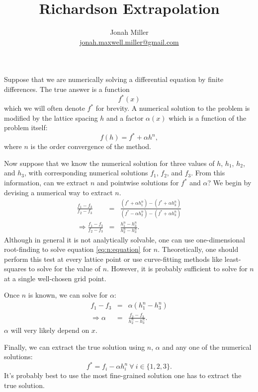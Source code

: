 \documentclass[]{article}
\author{Jonah Miller\\
  \href{mailto:jonah.maxwell.miller@gmail.com}{jonah.maxwell.miller@gmail.com}}
\title{Richardson Extrapolation}
\begin{document}
\maketitle

Suppose that we are numerically solving a differential equation by
finite differences. The true answer is a function
\begin{equation}
  \label{eq:f^*(x)}
  f^*(x)
\end{equation}
which we will often denote $f^*$ for brevity. A numerical solution to
the problem is modified by the lattice spacing $h$ and a factor
$\alpha(x)$ which is a function of the problem itself:
\begin{equation}
  \label{eq:f(h)}
  f(h) = f^* + \alpha h^n,
\end{equation}
where $n$ is the order convergence of the method.

Now suppose that we know the numerical solution for three values of
$h$, $h_1$, $h_2$, and $h_3$, with corresponding numerical solutions
$f_1$, $f_2$, and $f_3$. From this information, can we extract $n$ and
pointwise solutions for $f^*$ and $\alpha$? We begin by devising a
numerical way to extract $n$. 
\begin{eqnarray}
  \frac{f_1 - f_3}{f_2-f_3} &=& \frac{(f^* + \alpha h_1^n) - (f^*+\alpha h_3^n)}{(f^* - \alpha h_2^n) - (f^* + \alpha h_3^n)}\nonumber\\
  \label{eq:n:equation}
  \Rightarrow \frac{f_1 - f_3}{f_2-f_3} &=& \frac{h_1^n - h_3^n}{h_2^n - h_3^n}.
\end{eqnarray}
Although in general it is not analytically solvable, one can use
one-dimensional root-finding to solve equation \eqref{eq:n:equation}
for $n$. Theoretically, one should perform this test at every lattice
point or use curve-fitting methods like least-squares to solve for the
value of $n$. However, it is probably sufficient to solve for $n$ at a
single well-chosen grid point.

Once $n$ is known, we can solve for $\alpha$:
\begin{eqnarray}
  f_1 - f_3 &=& \alpha(h_1^n - h_3^n)\nonumber\\
  \label{eq:alpha:equation}
  \Rightarrow \alpha &=& \frac{f_2 - f_3}{h_2^n - h_3^n}.
\end{eqnarray}
$\alpha$ will very likely depend on $x$.

Finally, we can extract the true solution using $n$, $\alpha$ and any
one of the numerical solutions:
\begin{equation}
  \label{eq:true:solution}
  f^* = f_i - \alpha h_i^n\ \forall\ i\in\{1,2,3\}.
\end{equation}
It's probably best to use the most fine-grained solution one has to
extract the true solution.
\end{document}
